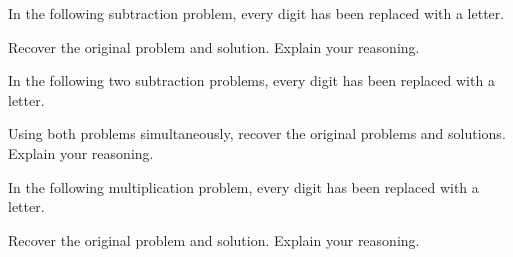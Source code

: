 \documentclass[nooutcomes]{ximera}
\begin{document}
\begin{problem}In the following subtraction problem, every digit has been
  replaced with a letter.
\begin{image}
\end{image}
Recover the original problem and solution. Explain your reasoning.
\end{problem} \begin{problem}In the following two subtraction problems, every digit has been
  replaced with a letter.
\begin{image}
\end{image}
Using both problems simultaneously, recover the original problems and
solutions. Explain your reasoning.
\end{problem} 

\begin{problem}In the following multiplication problem, every digit has been
  replaced with a letter.
\begin{image}
\end{image}
Recover the original problem and solution. Explain your reasoning.


\end{problem} 
\end{document}
